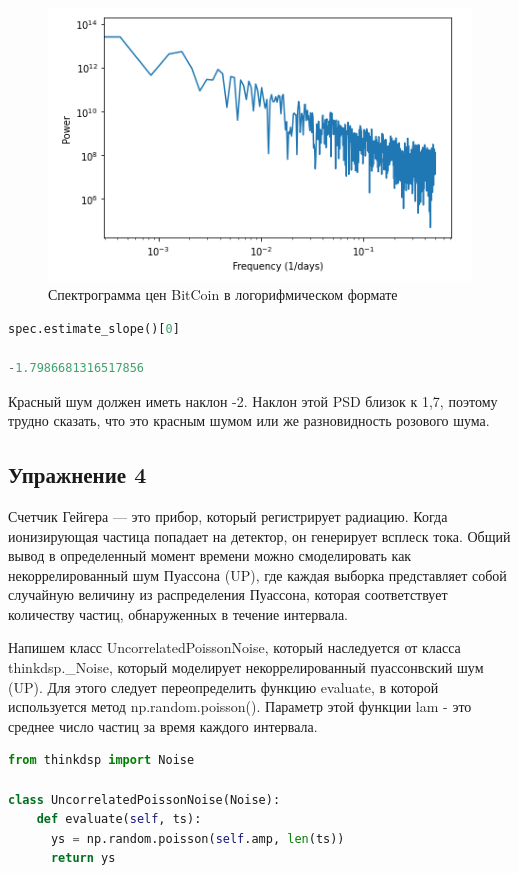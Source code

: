 \begin{figure}[H]
	\begin{center}
		\includegraphics[scale=1]{fig/lab04/lab04_09.png}
		\caption{Спектрограмма цен BitCoin в логорифмическом формате}
	\end{center}
\end{figure}

\begin{lstlisting}[language=Python]
spec.estimate_slope()[0]

-1.7986681316517856
\end{lstlisting}

Красный шум должен иметь наклон -2. Наклон этой PSD близок к 1,7, поэтому трудно сказать, что это красным шумом или же разновидность розового шума.


\subsection{Упражнение 4}

Счетчик Гейгера — это прибор, который регистрирует радиацию. Когда ионизирующая частица попадает на детектор, он генерирует всплеск тока. Общий вывод в определенный момент времени можно смоделировать как некоррелированный шум Пуассона (UP), где каждая выборка представляет собой случайную величину из распределения Пуассона, которая соответствует количеству частиц, обнаруженных в течение интервала.

Напишем класс UncorrelatedPoissonNoise, который наследуется от класса thinkdsp._Noise, который моделирует некоррелированный пуассонвский шум (UP). Для этого следует переопределить функцию evaluate, в которой используется метод np.random.poisson(). Параметр этой функции lam - это среднее число частиц за время каждого интервала.

\begin{lstlisting}[language=Python]
from thinkdsp import Noise

class UncorrelatedPoissonNoise(Noise):
    def evaluate(self, ts):
      ys = np.random.poisson(self.amp, len(ts))
      return ys
\end{lstlisting}

